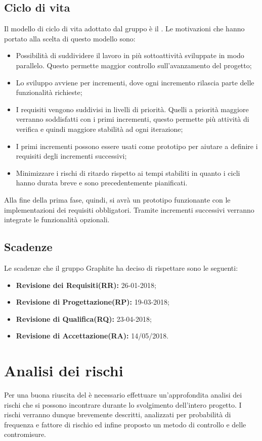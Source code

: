 \documentclass[./PianodiProgetto.tex]{subfiles}
\begin{document}
	\section{Ciclo di vita}
	
	Il modello di ciclo di vita adottato dal gruppo è il . Le motivazioni che hanno portato alla scelta di questo modello sono:
	\begin{itemize}
		\item Possibilità di suddividere il lavoro in più sottoattività sviluppate in modo parallelo. Questo permette maggior controllo sull’avanzamento del progetto;
		\item Lo sviluppo avviene per incrementi, dove ogni incremento rilascia parte delle funzionalità richieste;
		\item I requisiti vengono suddivisi in livelli di priorità. Quelli a priorità maggiore verranno soddisfatti con i primi incrementi, questo permette più attività di verifica e quindi maggiore stabilità ad ogni iterazione;
		\item I primi incrementi possono essere usati come prototipo per aiutare a definire i requisiti degli incrementi successivi;
		\item Minimizzare i rischi di ritardo rispetto ai tempi stabiliti in quanto i cicli hanno durata breve e sono precedentemente pianificati.
	\end{itemize}
	Alla fine della prima fase, quindi, si avrà un prototipo funzionante con le implementazioni dei requisiti obbligatori. Tramite incrementi successivi verranno integrate le funzionalità opzionali.
	
	\section{Scadenze}
	Le scadenze che il gruppo Graphite ha deciso di rispettare sono le seguenti:
	\begin{itemize}
		\item \textbf{Revisione dei Requisiti(RR):} 26-01-2018;
		\item \textbf{Revisione di Progettazione(RP):} 19-03-2018;
		\item \textbf{Revisione di Qualifica(RQ):} 23-04-2018;
		\item \textbf{Revisione di Accettazione(RA):} 14/05/2018.
	\end{itemize}
	
	\chapter{Analisi dei rischi}
	Per una buona riuscita del  è necessario effettuare un'approfondita analisi dei rischi che si possono incontrare durante lo svolgimento dell'intero progetto. I rischi verranno dunque brevemente descritti, analizzati per probabilità di frequenza e fattore di rischio ed infine proposto un metodo di controllo e delle contromisure.
	
\end{document}

